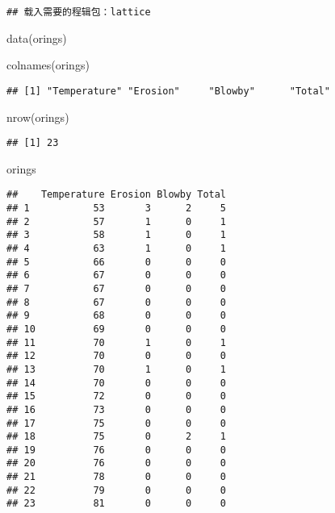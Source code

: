 \documentclass[
]{article}
\newenvironment{Shaded}{\begin{snugshade}}{\end{snugshade}}
\newcommand{\FunctionTok}[1]{\textcolor[rgb]{0.00,0.00,0.00}{#1}}
\newcommand{\NormalTok}[1]{#1}
\begin{document}
\begin{verbatim}
## 载入需要的程辑包：lattice
\end{verbatim}

\begin{Shaded}
\begin{Highlighting}[]
\FunctionTok{data}\NormalTok{(orings)}
\end{Highlighting}
\end{Shaded}

\begin{Shaded}
\begin{Highlighting}[]
\FunctionTok{colnames}\NormalTok{(orings)}
\end{Highlighting}
\end{Shaded}

\begin{verbatim}
## [1] "Temperature" "Erosion"     "Blowby"      "Total"
\end{verbatim}

\begin{Shaded}
\begin{Highlighting}[]
\FunctionTok{nrow}\NormalTok{(orings)}
\end{Highlighting}
\end{Shaded}

\begin{verbatim}
## [1] 23
\end{verbatim}

\begin{Shaded}
\begin{Highlighting}[]
\NormalTok{orings}
\end{Highlighting}
\end{Shaded}

\begin{verbatim}
##    Temperature Erosion Blowby Total
## 1           53       3      2     5
## 2           57       1      0     1
## 3           58       1      0     1
## 4           63       1      0     1
## 5           66       0      0     0
## 6           67       0      0     0
## 7           67       0      0     0
## 8           67       0      0     0
## 9           68       0      0     0
## 10          69       0      0     0
## 11          70       1      0     1
## 12          70       0      0     0
## 13          70       1      0     1
## 14          70       0      0     0
## 15          72       0      0     0
## 16          73       0      0     0
## 17          75       0      0     0
## 18          75       0      2     1
## 19          76       0      0     0
## 20          76       0      0     0
## 21          78       0      0     0
## 22          79       0      0     0
## 23          81       0      0     0
\end{verbatim}
\end{document}
